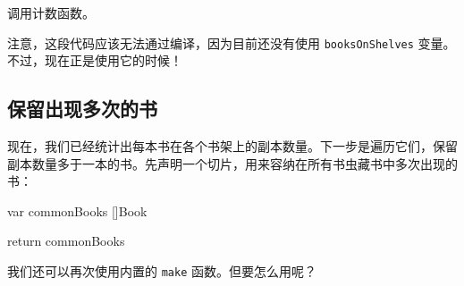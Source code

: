 \begin{codeannotations}
  \item 调用计数函数。
\end{codeannotations}

注意，这段代码应该无法通过编译，因为目前还没有使用 \texttt{booksOnShelves} 变量。不过，现在正是使用它的时候！

\subsection{保留出现多次的书}

现在，我们已经统计出每本书在各个书架上的副本数量。下一步是遍历它们，保留副本数量多于一本的书。先声明一个切片，用来容纳在所有书虫藏书中多次出现的书：

\begin{gocode}[]
var commonBooks []Book

return commonBooks
\end{gocode}

我们还可以再次使用内置的 \texttt{make} 函数。但要怎么用呢？

